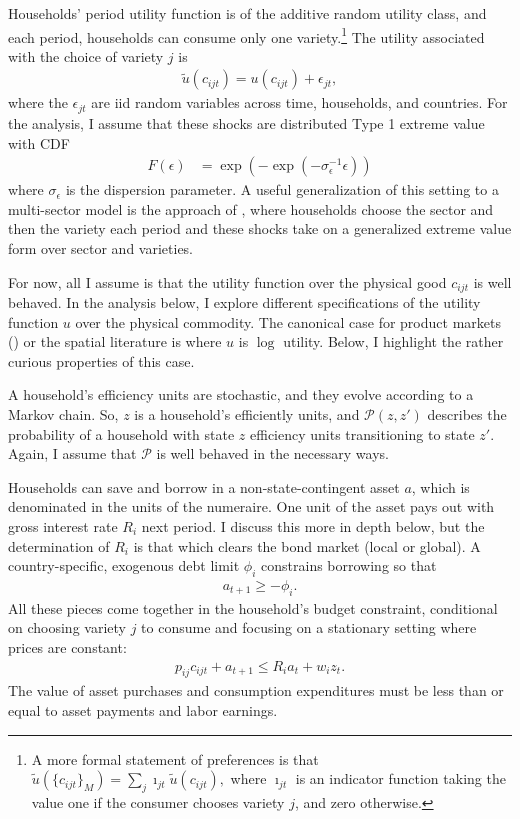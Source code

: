 \documentclass[12pt,pdftex]{article}
\begin{document}
\begin{onehalfspacing}
Households' period utility function is of the additive random utility class, and each period, households can consume only one variety.\footnote{A more formal statement of preferences is that $\tilde{u}( \{ c_{ijt} \}_{M}) = \sum_j \imath_{jt} \tilde{u}( c_{ijt}),$ where $\imath_{jt}$ is an indicator function taking the value one if the consumer chooses variety $j$, and zero otherwise.} The utility associated with the choice of variety $j$ is
\begin{align}
\tilde{u}( c_{ijt} ) =  u(c_{ijt}) + \epsilon_{jt}, \label{eq:utility}
\end{align}
where the $\epsilon_{jt}$ are iid random variables across time, households, and countries. For the analysis, I assume that these shocks are distributed Type 1 extreme value with CDF
\begin{align}
F(\epsilon) &= \exp(-\exp(-\sigma_{\epsilon}^{-1}\epsilon))
\end{align}
where $\sigma_{\epsilon}$ is the dispersion parameter. A useful generalization of this setting to a multi-sector model is the approach of \citet{p-iq}, where households choose the sector and then the variety each period and these shocks take on a generalized extreme value form over sector and varieties.

For now, all I assume is that the utility function over the physical good $c_{ijt}$ is well behaved. In the analysis below, I explore different specifications of the utility function $u$ over the physical commodity. The canonical case for product markets (\citet{anderson1987ces}) or the spatial literature is where $u$ is $\log$ utility. Below, I highlight the rather curious properties of this case.

A household's efficiency units are stochastic, and they evolve according to a Markov chain. So, $z$ is a household's efficiently units, and $\mathcal{P}(z,z')$ describes the probability of a household with state $z$ efficiency units transitioning to state $z'$. Again, I assume that $\mathcal{P}$ is well behaved in the necessary ways.

Households can save and borrow in a non-state-contingent asset $a$, which is denominated in the units of the numeraire. One unit of the asset pays out with gross interest rate $R_i$ next period. I discuss this more in depth below, but the determination of $R_{i}$ is that which clears the bond market (local or global). A country-specific, exogenous debt limit $\phi_{i}$ constrains borrowing so that
\begin{align}
a_{t+1} \geq - \phi_{i}.
\label{eq:borrowing-constraint}
\end{align}
All these pieces come together in the household's budget constraint, conditional on choosing variety $j$ to consume and focusing on a stationary setting where prices are constant:
\begin{align}
p_{ij}c_{ijt} +  a_{t+1} \leq    R_{i} a_{t} + w_{i} z_{t}.\label{eq:trade-budget-constraint}
\end{align}
The value of asset purchases and consumption expenditures must be less than or equal to asset payments and labor earnings.


\end{onehalfspacing}
\end{document}
